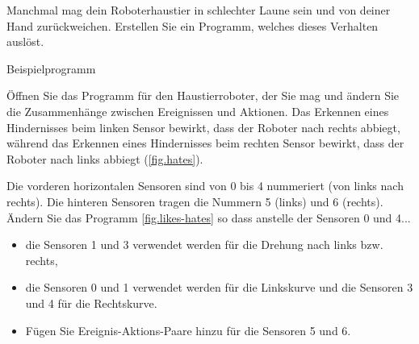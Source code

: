 Manchmal mag dein Roboterhaustier in schlechter Laune sein und von deiner Hand zurückweichen. Erstellen Sie ein Programm, welches dieses Verhalten auslöst.

{\raggedleft \hfill Beispielprogramm }

Öffnen Sie das Programm für den Haustierroboter, der Sie mag und ändern Sie die Zusammenhänge zwischen Ereignissen und Aktionen. Das Erkennen eines Hindernisses beim linken Sensor bewirkt, dass der Roboter nach rechts abbiegt, 
während das Erkennen eines Hindernisses beim rechten Sensor bewirkt, 
dass der Roboter nach links abbiegt (\cref{fig.hates}).


 {Die vorderen horizontalen Sensoren sind von 0 bis 4 nummeriert (von links nach rechts). Die hinteren Sensoren tragen die Nummern 5 (links) und 6 (rechts). Ändern Sie das Programm \cref{fig.likes-hates} so dass anstelle der Sensoren 0 und 4...
\begin{itemize}[noitemsep,nosep,leftmargin=*]
\item die Sensoren 1 und 3 verwendet werden für die Drehung nach links bzw. rechts, 
\item die Sensoren 0 und 1 verwendet werden für die Linkskurve und die Sensoren 3 und 4 für die Rechtskurve.
\item Fügen Sie Ereignis-Aktions-Paare hinzu für die Sensoren 5 und 6.
\end{itemize}
}

\bigskip


